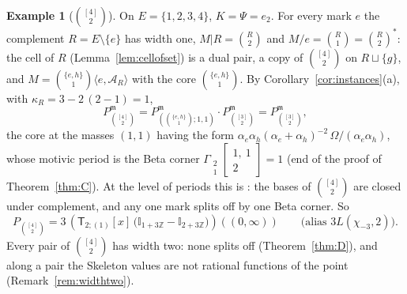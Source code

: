 \documentclass[11pt]{article}
\theoremstyle{plain}
\theoremstyle{definition}
\newtheorem{example}[prop]{Example}
\theoremstyle{remark}
\newcommand{\Z}{\mathbb Z}
\newcommand{\m}{\mathfrak m}
\newcommand{\sT}{\mathsf T}
\newcommand{\Gst}[4]{\Gamma_{\substack{#1\\#2}}\!\begin{bmatrix}#3\\#4\end{bmatrix}}
\newcommand{\Ilat}[1]{\mathbb I_{#1}}
\newcommand{\Tx}[3]{(\sT_{#1;(1)}[x]\,#2)((#3,\infty))}
\begin{document}
\begin{example}[$\binom{[4]}2$]\label{ex:U24}
On $E=\{1,2,3,4\}$, $K=\Psi=e_2$. For every mark $e$ the complement $R=E\setminus\{e\}$ has width one, $M|R=\binom R2$ and $M/e=\binom R1=\binom R2^\ast$: the cell of $R$ (Lemma~\ref{lem:cellofset}) is a dual pair, a copy of $\binom{[4]}2$ on $R\sqcup\{g\}$, and $M=\binom{\{e,h\}}1\langle e,\mathcal A_R\rangle$ with the core $\binom{\{e,h\}}1$. By Corollary~\ref{cor:instances}(a), with $\kappa_R=3-2\,(2-1)=1$,
\[
P^{\m}_{\binom{[4]}2}=P^{\m}_{(\binom{\{e,h\}}1;1,1)}\cdot P^{\m}_{\binom{[3]}2}=P^{\m}_{\binom{[3]}2},
\]
the core at the masses $(1,1)$ having the form $\alpha_e\alpha_h(\alpha_e+\alpha_h)^{-2}\,\Omega/(\alpha_e\alpha_h)$, whose motivic period is the Beta corner $\Gst21{1,\ 1}{2}=1$ (end of the proof of Theorem~\ref{thm:C}). At the level of periods this is \cite[Cor.~22.8(iii), p.~186]{F}: the bases of $\binom{[4]}2$ are closed under complement, and any one mark splits off by one Beta corner. So
\[
P_{\binom{[4]}2}=3\,\Tx{2}{\big(\Ilat{1+3\Z}-\Ilat{2+3\Z}\big)}{0}\qquad\text{(alias $3L(\chi_{-3},2)$)}.
\]
Every pair of $\binom{[4]}2$ has width two: none splits off (Theorem~\ref{thm:D}), and along a pair the Skeleton values are not rational functions of the point (Remark~\ref{rem:widthtwo}).
\end{example}
\end{document}
